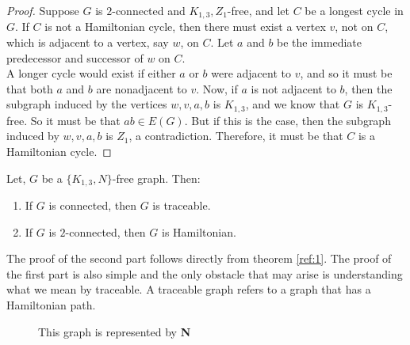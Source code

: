 \documentclass[../basic_graph_theory.tex]{subfiles}
\begin{document}
\begin{proof}
    Suppose $G$ is $2$-connected and ${K_{1,3}, Z_1}$-free, and let $C$ be a longest cycle in $G$. If $C$ is not a Hamiltonian cycle, then there must exist a vertex $v$, not on $C$, which is adjacent to a vertex, say $w$, on $C$. Let $a$ and $b$ be the immediate predecessor and successor of $w$ on $C$.\\
    A longer cycle would exist if either $a$ or $b$ were adjacent to $v$, and so it must be that both $a$ and $b$ are nonadjacent to $v$. Now, if $a$ is not adjacent to $b$, then the subgraph induced by the vertices ${w,v,a,b}$ is $K_{1,3}$, and we know that $G$ is $K_{1,3}$-free. So it must be that $ab \in E(G)$. But if this is the case, then the subgraph induced by ${w,v,a,b}$ is $Z_1$, a contradiction. Therefore, it must be that $C$ is a Hamiltonian cycle.
\end{proof}

\begin{Thm}{}{}
    \label{ref:1}
    Let, $G$ be a $\{K_{1,3}, N\}$-free graph. Then:\\
    \begin{enumerate}
        \item If $G$ is connected, then $G$ is traceable.
        \item If $G$ is $2$-connected, then $G$ is Hamiltonian.
    \end{enumerate}
\end{Thm}

The proof of the second part follows directly from theorem \ref{ref:1}. The proof of the first part is also simple and the only obstacle that may arise is understanding what we mean by traceable. A traceable graph refers to a graph that has a Hamiltonian path.
\begin{figure}[htbp]
    \begin{center}
    \end{center}
    \caption{This graph is represented by \textbf{N}}
\end{figure}
\end{document}
